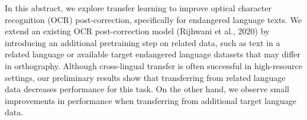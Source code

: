 In this abstract, we explore transfer learning to improve optical character recognition (OCR) post-correction, specifically for endangered language texts. We extend an existing OCR post-correction model (Rijhwani et al., 2020) by introducing an additional pretraining step on related data, such as text in a related language or available target endangered language datasets that may differ in orthography. Although cross-lingual transfer is often successful in high-resource settings, our preliminary results show that transferring from related language data decreases performance for this task. On the other hand, we observe small improvements in performance when transferring from additional target language data.
